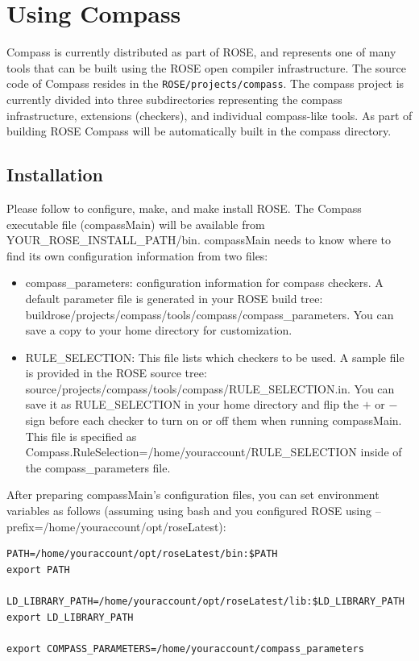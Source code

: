 \chapter{Using Compass}
Compass is currently distributed as part of ROSE, and represents one
of many tools that can be built using the ROSE open compiler infrastructure.
The source code of Compass resides in the {\tt ROSE/projects/compass}.
The compass project is currently divided into three subdirectories representing
the compass infrastructure, extensions (checkers), and individual compass-like
tools. As part of building ROSE Compass will be automatically built in the 
compass directory. 

\section{Installation}
Please follow
 to
configure, make, and make install ROSE. The Compass executable file
(compassMain) will be available from YOUR\_ROSE\_INSTALL\_PATH/bin. compassMain needs to know where to find its own configuration information from two
files:
\begin{itemize}
\item compass\_parameters: configuration information for compass checkers.
A default parameter file is generated in your ROSE build tree:
buildrose/projects/compass/tools/compass/compass\_parameters. You can
save a copy to your home directory for customization. 
\item RULE\_SELECTION: This file lists which checkers to be used. A sample
file is provided in the ROSE source tree:
source/projects/compass/tools/compass/RULE\_SELECTION.in. You can save
it as RULE\_SELECTION in your home directory and flip the $+$ or $-$ sign
before each checker to turn on or off them when running compassMain. This
file is specified as Compass.RuleSelection=/home/youraccount/RULE\_SELECTION
inside of the compass\_parameters file.
\end{itemize}

After preparing compassMain's configuration files, you can set environment variables as follows (assuming using bash
and you configured ROSE using --prefix=/home/youraccount/opt/roseLatest):

\begin{verbatim}
PATH=/home/youraccount/opt/roseLatest/bin:$PATH
export PATH

LD_LIBRARY_PATH=/home/youraccount/opt/roseLatest/lib:$LD_LIBRARY_PATH
export LD_LIBRARY_PATH

export COMPASS_PARAMETERS=/home/youraccount/compass_parameters
\end{verbatim}


